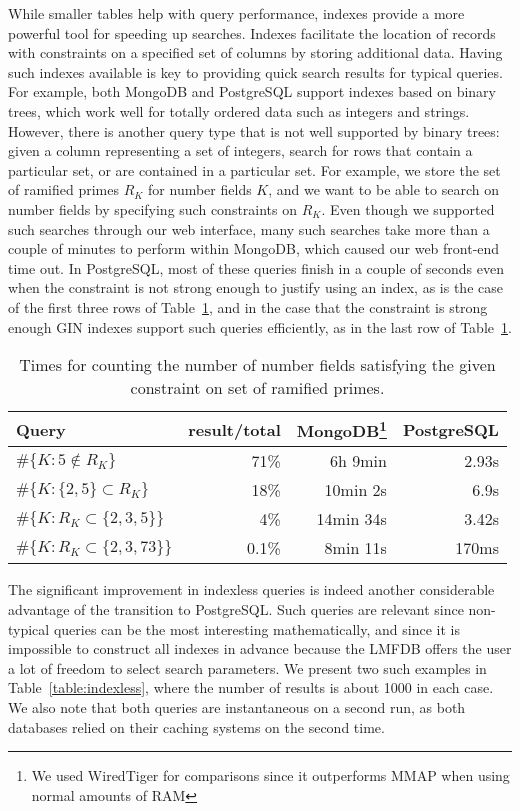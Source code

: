 \documentclass{amsart}
\begin{document}
While smaller tables help with query performance, indexes provide a more powerful tool for speeding up searches.
Indexes facilitate the location of records with constraints on a specified set of columns by storing additional data.
Having such indexes available is key to providing quick search results for typical queries.
For example, both MongoDB and PostgreSQL support indexes based on binary trees, which work well for totally ordered data such as integers and strings.
However, there is another query type that is not well supported by binary trees: given a column representing a set of integers, search for rows that contain a particular set, or are contained in a particular set.
For example, we store the set of ramified primes $R_K$ for number fields $K$, and we want to be able to search on number fields by specifying such constraints on $R_K$.
Even though we supported such searches through our web interface, many such searches take more than a couple of minutes to perform within MongoDB, which caused our web front-end time out.
In PostgreSQL, most of these queries finish in a couple of seconds even when the constraint is not strong enough to justify using an index, as is the case of the first three rows of Table~\ref{table:ramps}, and in the case that the constraint is strong enough GIN indexes support such queries efficiently, as in the last row of Table~\ref{table:ramps}.
\begin{table}[h!]
  \begin{center}
  \begin{tabular}{l|r|r|r}
    Query & result/total & MongoDB\footnote{We used WiredTiger for comparisons since it outperforms MMAP when using normal amounts of RAM} & PostgreSQL\\
\hline
$\#\{K : 5 \notin R_K \}$ & 71\% & 6h 9min & 2.93s \\
$\#\{K : \{2, 5\} \subset R_K\}$ & 18\% &10min 2s & 6.9s\\
$\#\{K: R_K \subset \{2, 3, 5\} \}$ & 4\% & 14min 34s & 3.42s\\
$\#\{K: R_K \subset \{2, 3, 73\} \}$ & 0.1\% & 8min 11s & 170ms
\end{tabular}
\caption{Times for counting the number of number fields satisfying the given constraint on set of ramified primes.}
\label{table:ramps}
\end{center}
\end{table}


The significant improvement in indexless queries is indeed another considerable advantage of the transition to PostgreSQL.
Such queries are relevant since non-typical queries can be the most interesting mathematically, and since it is impossible to construct all indexes in advance because the LMFDB offers the user a lot of freedom to select search parameters.
We present two such examples in Table~\ref{table:indexless}, where the number of results is about 1000 in each case.
We also note that both queries are instantaneous on a second run, as both databases relied on their caching systems on the second time.
\end{document}
